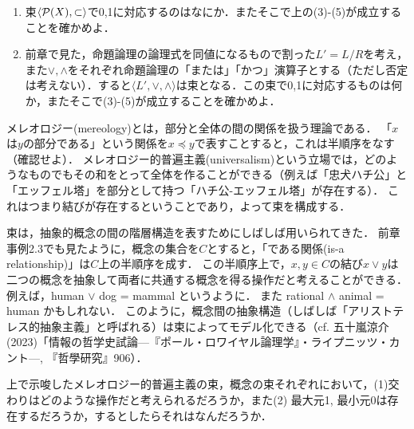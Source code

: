 \documentclass[11pt,a4paper, dvipdfmx]{jsarticle}
\begin{document}
\begin{exercise}
\begin{enumerate} \label{logic}
    \item 束$\langle \mathcal{P}(X), \subset \rangle$で0,1に対応するのはなにか．またそこで上の(3)-(5)が成立することを確かめよ．
    \item 前章で見た，命題論理の論理式を同値になるもので割った$L'= L/R$を考え，また$\vee, \wedge$をそれぞれ命題論理の「または」「かつ」演算子とする（ただし否定は考えない）．すると$\langle L', \vee, \wedge \rangle$は束となる．この束で0,1に対応するものは何か，またそこで(3)-(5)が成立することを確かめよ．
\end{enumerate}
\end{exercise}

\begin{example}[メレオロジー] \label{mereology}
メレオロジー(mereology)とは，部分と全体の間の関係を扱う理論である．
「$x$は$y$の部分である」という関係を$x \preceq y$で表すことすると，これは半順序をなす（確認せよ）．
メレオロジー的普遍主義(universalism)という立場では，どのようなものでもその和をとって全体を作ることができる（例えば「忠犬ハチ公」と「エッフェル塔」を部分として持つ「ハチ公-エッフェル塔」が存在する）．
これはつまり結びが存在するということであり，よって束を構成する．
\end{example}

\begin{example}[概念の束] \label{concept}
束は，抽象的概念の間の階層構造を表すためにしばしば用いられてきた．
前章事例2.3でも見たように，概念の集合を$C$とすると，「である関係(is-a relationship)」は$C$上の半順序を成す．
この半順序上で，$x, y \in C$の結び$x \vee y$は二つの概念を抽象して両者に共通する概念を得る操作だと考えることができる．
例えば，human $\vee$ dog = mammal というように．
また rational $\wedge$ animal = human かもしれない．
このように，概念間の抽象構造（しばしば「アリストテレス的抽象主義」と呼ばれる）は束によってモデル化できる（cf. 五十嵐涼介(2023)「情報の哲学史試論---『ポール・ロワイヤル論理学』・ライプニッツ・カント---, 『哲學研究』906）．
\end{example}

\begin{exercise} 
上で示唆したメレオロジー的普遍主義の束，概念の束それぞれにおいて，(1)交わりはどのような操作だと考えられるだろうか，また(2) 最大元1, 最小元0は存在するだろうか，するとしたらそれはなんだろうか．
\end{exercise}
\end{document}
